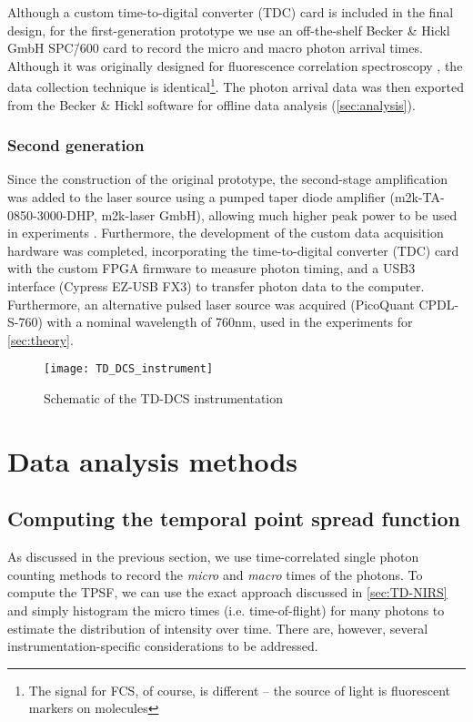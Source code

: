 Although a custom time-to-digital converter (TDC) card is included in the final design, for the first-generation prototype we use an off-the-shelf Becker \& Hickl GmbH SPC\=/600 \cite{Becker2014} card to record the micro and macro photon arrival times. Although it was originally designed for fluorescence correlation spectroscopy \cite{Becker2005, Becker2014}, the data collection technique is identical\footnote{The signal for FCS, of course, is different -- the source of light is fluorescent markers on molecules}. The photon arrival data was then exported from the Becker \& Hickl software for offline data analysis (\autoref{sec:analysis}).


\subsubsection{Second generation}
Since the construction of the original prototype, the second-stage amplification was added to the laser source using a pumped taper diode amplifier (m2k-TA-0850-3000-DHP, m2k-laser GmbH), allowing much higher peak power to be used in experiments \cite{Kangara2014,Poelker1995}. Furthermore, the development of the custom data acquisition hardware was completed, incorporating the time-to-digital converter (TDC) card with the custom FPGA firmware to measure photon timing, and a USB3 interface (Cypress EZ-USB FX3) to transfer photon data to the computer. Furthermore, an alternative pulsed laser source was acquired (PicoQuant CPDL-S-760) with a nominal wavelength of 760nm, used in the experiments for \autoref{sec:theory}.


\begin{figure}[tb]
    \centering
    \texttt{[image: TD\_DCS\_instrument]}
    \caption{Schematic of the TD-DCS instrumentation}
    \label{fig:TD-DCS_instrument}
\end{figure}


\section{Data analysis methods} \label{sec:analysis}

\subsection{Computing the temporal point spread function}

As discussed in the previous section, we use time-correlated single photon counting methods to record the \emph{micro} and \emph{macro} times of the photons. To compute the TPSF, we can use the exact approach discussed in \autoref{sec:TD-NIRS} and simply histogram the micro times (i.e. time-of-flight) for many photons to estimate the distribution of intensity over time. There are, however, several instrumentation-specific considerations to be addressed.


